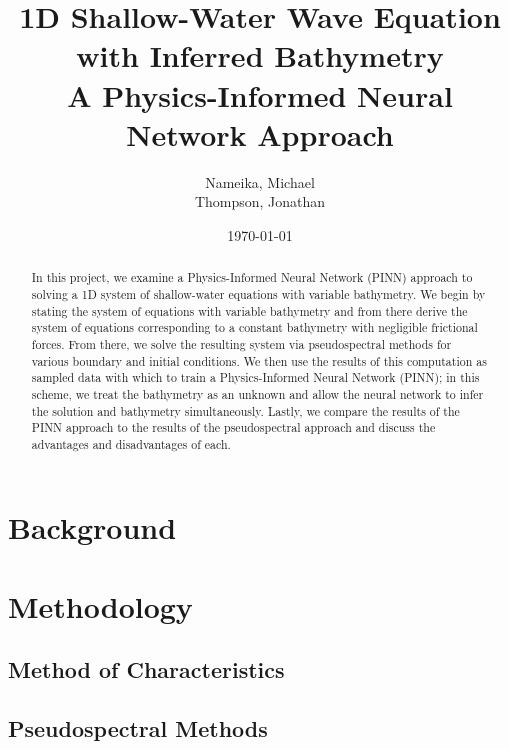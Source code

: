 \documentclass[letterpaper,11pt]{article}
\begin{document}
    \title{%
        1D Shallow-Water Wave Equation with Inferred Bathymetry\\
        \large A Physics-Informed Neural Network Approach
    }
    \author{%
        Nameika, Michael \\
        Thompson, Jonathan
    }
    \date{\today}
    \maketitle

    \begin{abstract}
        In this project, we examine a Physics-Informed Neural Network (PINN) approach to solving a 1D system of 
        shallow-water equations with variable bathymetry. We begin by stating the system of equations with variable
        bathymetry and from there derive the system of equations corresponding to a constant bathymetry with negligible
        frictional forces. From there, we solve the resulting system via pseudospectral methods for various boundary
        and initial conditions. We then use the results of this computation as sampled data with which to train a 
        Physics-Informed Neural Network (PINN); in this scheme, we treat the bathymetry as an unknown and allow the 
        neural network to infer the solution and bathymetry simultaneously. Lastly, we compare the results of the PINN
        approach to the results of the pseudospectral approach and discuss the advantages and disadvantages of each.
    \end{abstract}

    \section{Background}\label{sec:background}

    

    \section{Methodology}\label{sec:proposed-methodology}

    \subsection{Method of Characteristics}\label{subset:moc-methodology}

    

    \subsection{Pseudospectral Methods}\label{subsec:pseudospectral-methodology}
\end{document}
